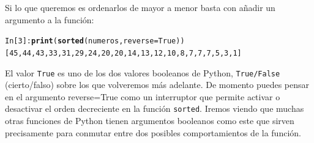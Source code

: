 \documentclass[10pt,a4paper]{article}\usepackage[]{graphicx}\usepackage[]{color}
\makeatletter
\newcommand{\hlkwd}[1]{\textcolor[rgb]{0.737,0.353,0.396}{\textbf{#1}}}%
\newenvironment{kframe}{%
 \def\at@end@of@kframe{}%
 \ifinner\ifhmode%
  \def\at@end@of@kframe{\end{minipage}}%
  \begin{minipage}{\columnwidth}%
 \fi\fi%
 \def\FrameCommand##1{\hskip\@totalleftmargin \hskip-\fboxsep
 \colorbox{shadecolor}{##1}\hskip-\fboxsep
     \hskip-\linewidth \hskip-\@totalleftmargin \hskip\columnwidth}%
 \MakeFramed {\advance\hsize-\width
   \@totalleftmargin\z@ \linewidth\hsize
   \@setminipage}}%
 {\par\unskip\endMakeFramed%
 \at@end@of@kframe}
\newenvironment{knitrout}{}{} %
\makeatother
\begin{document}
Si lo que queremos es ordenarlos de mayor a menor basta con añadir un argumento a la función:
\begin{knitrout}
\color{fgcolor}\begin{kframe}
\begin{alltt}
In [3]: \hlkwd{print}(\hlkwd{sorted}(numeros, reverse=True))
[45, 44, 43, 33, 31, 29, 24, 20, 20, 14, 13, 12, 10, 8, 7, 7, 7, 5, 3, 1]
\end{alltt}
\end{kframe}
\end{knitrout}
El valor {\tt True} es uno de los dos {\sf valores booleanos} de Python, {\tt True/False} (cierto/falso) sobre los que volveremos más adelante. De momento puedes pensar en el argumento  {\sf reverse=True} como un interruptor que permite activar o desactivar el orden decreciente en la función {\tt sorted}. Iremos viendo que muchas otras funciones de Python tienen argumentos booleanos como este que sirven precisamente para conmutar entre dos posibles comportamientos de la función.
\end{document}
